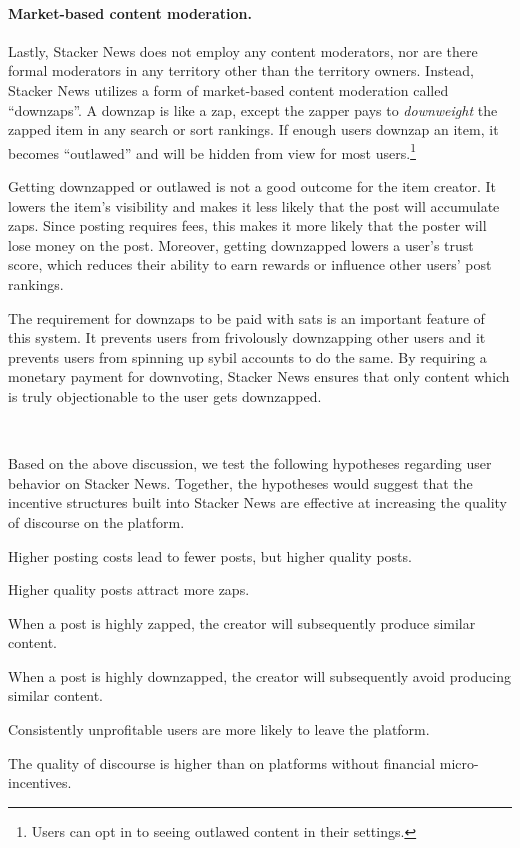 \paragraph{Market-based content moderation.} Lastly, Stacker News does not employ any content moderators, nor are there formal moderators in any territory other than the territory owners. Instead, Stacker News utilizes a form of market-based content moderation called ``downzaps''. A downzap is like a zap, except the zapper pays to \emph{downweight} the zapped item in any search or sort rankings. If enough users downzap an item, it becomes ``outlawed'' and will be hidden from view for most users.\footnote{Users can opt in to seeing outlawed content in their settings.}  

Getting downzapped or outlawed is not a good outcome for the item creator. It lowers the item's visibility and makes it less likely that the post will accumulate zaps. Since posting requires fees, this makes it more likely that the poster will lose money on the post. Moreover, getting downzapped lowers a user's trust score, which reduces their ability to earn rewards or influence other users' post rankings. 

The requirement for downzaps to be paid with sats is an important feature of this system. It prevents users from frivolously downzapping other users and it prevents users from spinning up sybil accounts to do the same. By requiring a monetary payment for downvoting, Stacker News ensures that only content which is truly objectionable to the user gets downzapped. 

~

\noindent Based on the above discussion, we test the following hypotheses regarding user behavior on Stacker News. Together, the hypotheses would suggest that the incentive structures built into Stacker News are effective at increasing the quality of discourse on the platform.

\begin{hyp}
Higher posting costs lead to fewer posts, but higher quality posts.
\end{hyp}
\begin{hyp}
Higher quality posts attract more zaps.
\end{hyp}
\begin{hyp}
When a post is highly zapped, the creator will subsequently produce similar content.
\end{hyp}
\begin{hyp}
When a post is highly downzapped, the creator will subsequently avoid producing similar content.
\end{hyp}
\begin{hyp}
Consistently unprofitable users are more likely to leave the platform.
\end{hyp}
\begin{hyp}
The quality of discourse is higher than on platforms without financial micro-incentives.
\end{hyp}

